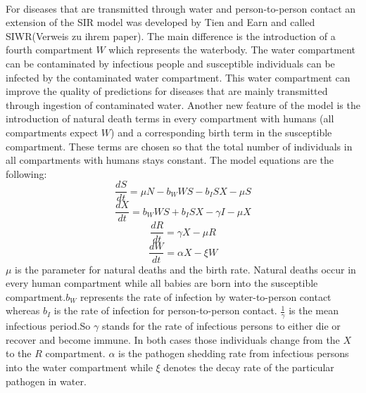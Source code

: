 \documentclass[11pt]{article}
\begin{document}
\\For diseases that are transmitted through water and person-to-person contact an extension of the SIR model was developed by Tien and Earn and called SIWR(Verweis zu ihrem paper). The main difference is the introduction of a fourth compartment $ W $ which represents the waterbody. The water compartment can be contaminated by infectious people and susceptible individuals can be infected by the contaminated water compartment. This water compartment can improve the quality of predictions for diseases that are mainly transmitted through ingestion of contaminated water.
\linebreak
Another new feature of the model is the introduction of natural death terms in every compartment with humans (all compartments expect $ W $) and a corresponding birth term in the susceptible compartment. These terms are chosen so that the total number of individuals in all compartments with humans stays constant.
The model equations are the following:
\begin{equation*}
\dfrac{dS}{dt}=\mu N-b_{W}WS-b_{I}SX-\mu S 
\end{equation*}
\begin{equation*}
\dfrac{dX}{dt}=b_{W}WS+b_{I}SX-\gamma I-\mu X
\end{equation*}
\begin{equation*}
\dfrac{dR}{dt}=\gamma X-\mu R
\end{equation*}
\begin{equation*}
\dfrac{dW}{dt}=\alpha X-\xi W
\end{equation*}
$ \mu $ is the parameter for natural deaths and the birth rate. Natural deaths occur in every human compartment while all babies are born into the susceptible compartment.$ b_{W} $ represents the rate of infection by water-to-person contact whereas $ b_{I} $ is the rate of infection for person-to-person contact. $\frac{1}{\gamma}$ is the mean infectious period.So $ \gamma $ stands for the rate of infectious persons to either die or recover and become immune. In both cases those individuals change from the $ X $ to the $ R $ compartment. $ \alpha $ is the pathogen shedding rate from infectious persons into the water compartment while $ \xi $ denotes the decay rate of the particular pathogen in water.
\\
\end{document}

